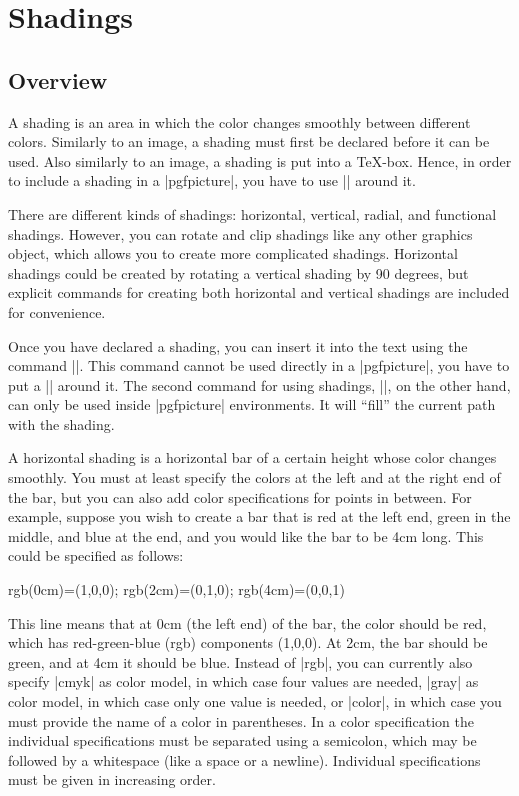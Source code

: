 %
%
%


\section[base-shadings]{Shadings}
\label{section-shadings}

\subsection{Overview}

A shading is an area in which the color changes smoothly between different
colors. Similarly to an image, a shading must first be declared before it can
be used. Also similarly to an image, a shading is put into a \TeX-box. Hence,
in order to include a shading in a |{pgfpicture}|, you have to use |\pgftext|
around it.

There are different kinds of shadings: horizontal, vertical, radial, and
functional shadings. However, you can rotate and clip shadings like any other
graphics object, which allows you to create more complicated shadings.
Horizontal shadings could be created by rotating a vertical shading by 90
degrees, but explicit commands for creating both horizontal and vertical
shadings are included for convenience.

Once you have declared a shading, you can insert it into the text using the
command |\pgfuseshading|. This command cannot be used directly in a
|{pgfpicture}|, you have to put a |\pgftext| around it. The second command for
using shadings, |\pgfshadepath|, on the other hand, can only be used  inside
|{pgfpicture}| environments. It will ``fill'' the current path with the
shading.

A horizontal shading is a horizontal bar of a certain height whose color
changes smoothly. You must at least specify the colors at the left and at the
right end of the bar, but you can also add color specifications for points in
between. For example, suppose you wish to create a bar that is red at the left
end, green in the middle, and blue at the end, and you would like the bar to be
4cm long. This could be specified as follows:
%
\begin{codeexample}
rgb(0cm)=(1,0,0); rgb(2cm)=(0,1,0); rgb(4cm)=(0,0,1)
\end{codeexample}
%
This line means that at 0cm (the left end) of the bar, the color should be red,
which has red-green-blue (rgb) components (1,0,0). At 2cm, the bar should be
green, and at 4cm it should be blue. Instead of |rgb|, you can currently also
specify |cmyk| as color model, in which case four values are needed,
|gray| as color model, in which case only one value is needed, or
|color|, in which case you must provide the name of a color in parentheses. In
a color specification the individual specifications must be separated using a
semicolon, which may be followed by a whitespace (like a space or a newline).
Individual specifications must be given in increasing order.

